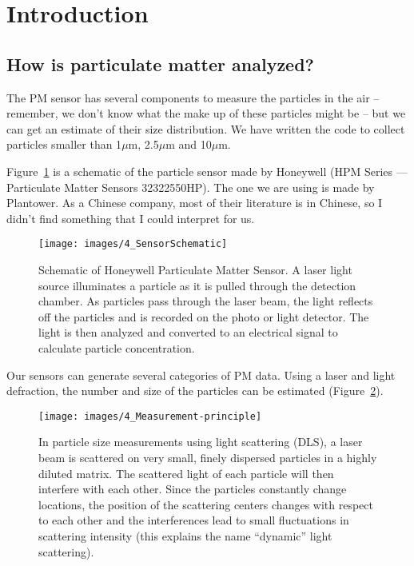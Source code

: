 \documentclass{article}\usepackage[]{graphicx}\usepackage[]{xcolor}
\begin{document}
\section{Introduction}

\subsection{How is particulate matter analyzed?}

The PM sensor has several components to measure the particles in the air -- remember, we don't know what the make up of these particles might be -- but we can get an estimate of their size distribution. We have written the code to collect particles smaller than 1$\mu$m, 2.5$\mu$m and 10$\mu$m. 

Figure~\ref{fig:hpsensor} is a schematic of the particle sensor made by Honeywell (HPM Series --- Particulate Matter Sensors 32322550HP). The one we are using is made by Plantower. As a Chinese company, most of their literature is in Chinese, so I didn't find something that I could interpret for us. 

\begin{figure}
\texttt{[image: images/4\_SensorSchematic]}
\caption{Schematic of Honeywell Particulate Matter Sensor. A laser light source illuminates a particle as it is pulled through the detection chamber. As particles pass through the laser beam, the light reflects off the particles and is recorded on the photo or light detector. The light is then analyzed and converted to an electrical signal to calculate particle concentration.}
\label{fig:hpsensor}
\end{figure}

Our sensors can generate several categories of PM data. Using a laser and light defraction, the number and size of the particles can be estimated (Figure~\ref{fig:defraction}).

\begin{figure}
\texttt{[image: images/4\_Measurement-principle]}
\caption{In particle size measurements using light scattering (DLS), a laser beam is scattered on very small, finely dispersed particles in a highly diluted matrix. 
The scattered light of each particle will then interfere with each other. Since the particles constantly change locations, the position of the scattering centers changes with respect to each other and the interferences lead to small fluctuations in scattering intensity (this explains the name ``dynamic'' light scattering).}
\label{fig:defraction}
\end{figure}
\end{document}
